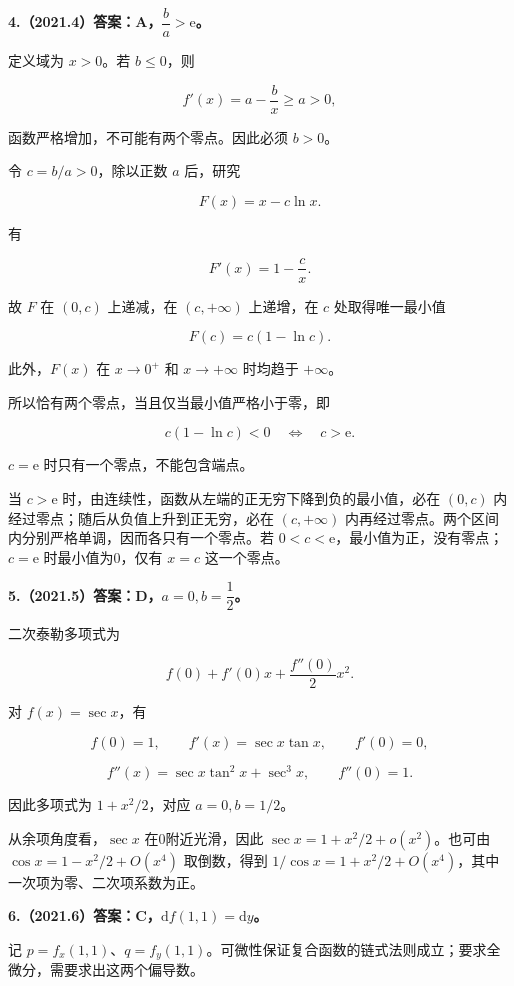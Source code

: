 \documentclass[UTF8,11pt,fontset=windows]{ctexart}
\begin{document}
\clearpage

\textbf{4.（2021.4）答案：A，$\dfrac ba>\mathrm e$。}

定义域为 $x>0$。若 $b\le0$，则

$$
f'(x)=a-\frac bx\ge a>0,
$$

函数严格增加，不可能有两个零点。因此必须 $b>0$。

令 $c=b/a>0$，除以正数 $a$ 后，研究

$$
F(x)=x-c\ln x.
$$

有

$$
F'(x)=1-\frac cx.
$$

故 $F$ 在 $(0,c)$ 上递减，在 $(c,+\infty)$ 上递增，在 $c$ 处取得唯一最小值

$$
F(c)=c(1-\ln c).
$$

此外，$F(x)$ 在 $x\to0^+$ 和 $x\to+\infty$ 时均趋于 $+\infty$。

所以恰有两个零点，当且仅当最小值严格小于零，即

$$
c(1-\ln c)<0\quad\Longleftrightarrow\quad c>\mathrm e.
$$

$c=\mathrm e$ 时只有一个零点，不能包含端点。

当 $c>\mathrm e$ 时，由连续性，函数从左端的正无穷下降到负的最小值，必在 $(0,c)$ 内经过零点；随后从负值上升到正无穷，必在 $(c,+\infty)$ 内再经过零点。两个区间内分别严格单调，因而各只有一个零点。若 $0<c<\mathrm e$，最小值为正，没有零点；$c=\mathrm e$ 时最小值为0，仅有 $x=c$ 这一个零点。

\clearpage

\textbf{5.（2021.5）答案：D，$a=0,b=\dfrac12$。}

二次泰勒多项式为

$$
f(0)+f'(0)x+\frac{f''(0)}2x^2.
$$

对 $f(x)=\sec x$，有

$$
f(0)=1,
\qquad f'(x)=\sec x\tan x,
\qquad f'(0)=0,
$$

$$
f''(x)=\sec x\tan^2x+\sec^3x,
\qquad f''(0)=1.
$$

因此多项式为 $1+x^2/2$，对应 $a=0,b=1/2$。

从余项角度看，$\sec x$ 在0附近光滑，因此 $\sec x=1+x^2/2+o(x^2)$。也可由 $\cos x=1-x^2/2+O(x^4)$ 取倒数，得到 $1/\cos x=1+x^2/2+O(x^4)$，其中一次项为零、二次项系数为正。

\clearpage

\textbf{6.（2021.6）答案：C，$\mathrm df(1,1)=\mathrm dy$。}

记 $p=f_x(1,1)$、$q=f_y(1,1)$。可微性保证复合函数的链式法则成立；要求全微分，需要求出这两个偏导数。
\end{document}
